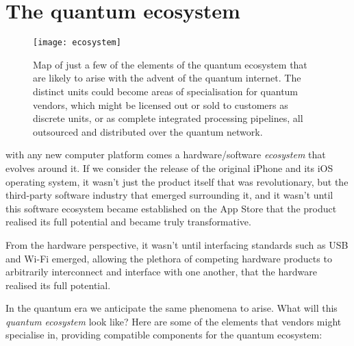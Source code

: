 %
%

\section{The quantum ecosystem}

\newline

\begin{figure*}[!htpb]
\texttt{[image: ecosystem]}
\captionspacefig \caption{Map of just a few of the elements of the quantum ecosystem that are likely to arise with the advent of the quantum internet. The distinct units could become areas of specialisation for quantum vendors, which might be licensed out or sold to customers as discrete units, or as complete integrated processing pipelines, all outsourced and distributed over the quantum network.}\label{fig:ecosystem}	
\end{figure*}

 with any new computer platform comes a hardware/software \textit{ecosystem} that evolves around it. If we consider the release of the original iPhone and its iOS operating system, it wasn't just the product itself that was revolutionary, but the third-party software industry that emerged surrounding it, and it wasn't until this software ecosystem became established on the App Store that the product realised its full potential and became truly transformative.

From the hardware perspective, it wasn't until interfacing standards such as USB and Wi-Fi emerged, allowing the plethora of competing hardware products to arbitrarily interconnect and interface with one another, that the hardware realised its full potential.

In the quantum era we anticipate the same phenomena to arise. What will this \textit{quantum ecosystem} look like? Here are some of the elements that vendors might specialise in, providing compatible components for the quantum ecosystem:

